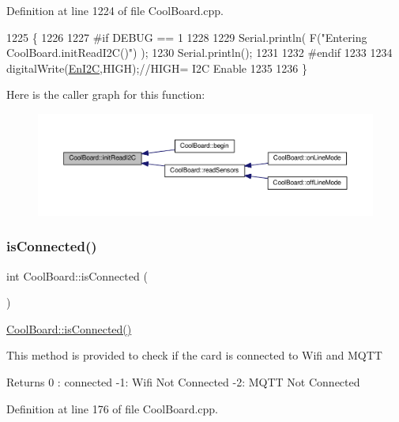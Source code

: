 Definition at line 1224 of file Cool\+Board.\+cpp.


\begin{DoxyCode}
1225 \{
1226 
1227 \textcolor{preprocessor}{#if DEBUG == 1}
1228 
1229     Serial.println( F(\textcolor{stringliteral}{"Entering CoolBoard.initReadI2C()"}) );
1230     Serial.println();
1231 
1232 \textcolor{preprocessor}{#endif}
1233  
1234     digitalWrite(\hyperlink{class_cool_board_af1fe1376fc66f93dee80b327ca695377}{EnI2C},HIGH);\textcolor{comment}{//HIGH= I2C Enable}
1235 
1236 \}
\end{DoxyCode}
Here is the caller graph for this function\+:
\nopagebreak
\begin{figure}[H]
\begin{center}
\leavevmode
\includegraphics[width=350pt]{d7/df9/class_cool_board_a397b46fadab8f530a8cf4d914c561366_icgraph}
\end{center}
\end{figure}
\mbox{\label{class_cool_board_ad7442cf4b62c7b0d5bd62a0f75ffc065}} 
\subsubsection{\texorpdfstring{is\+Connected()}{isConnected()}}
{\footnotesize\ttfamily int Cool\+Board\+::is\+Connected (\begin{DoxyParamCaption}{ }\end{DoxyParamCaption})}

\hyperlink{class_cool_board_ad7442cf4b62c7b0d5bd62a0f75ffc065}{Cool\+Board\+::is\+Connected()}

This method is provided to check if the card is connected to Wifi and M\+Q\+TT

\begin{DoxyReturn}{Returns}
0 \+: connected -\/1\+: Wifi Not Connected -\/2\+: M\+Q\+TT Not Connected 
\end{DoxyReturn}


Definition at line 176 of file Cool\+Board.\+cpp.


